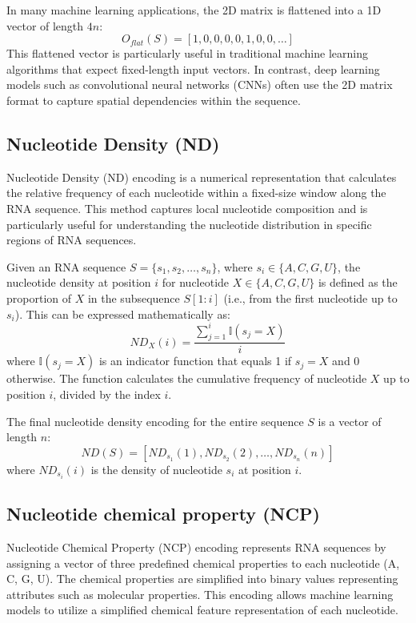     In many machine learning applications, the 2D matrix is flattened into a 1D vector of length $4n$:
    \[
      O_{flat}(S) = [1, 0, 0, 0, 0, 1, 0, 0, \dots]
    \]
    This flattened vector is particularly useful in traditional machine learning algorithms that expect fixed-length input vectors.
    In contrast, deep learning models such as convolutional neural networks (CNNs) often use the 2D matrix format to capture spatial dependencies within the sequence.

  \subsection{Nucleotide Density (ND)}\label{subsec:nd}
    Nucleotide Density (ND) encoding is a numerical representation that calculates the relative frequency of each nucleotide within a fixed-size window along the RNA sequence.
    This method captures local nucleotide composition and is particularly useful for understanding the nucleotide distribution in specific regions of RNA sequences.

    Given an RNA sequence $S = \{s_1, s_2, \dots, s_n\}$, where $s_i \in \{A, C, G, U\}$, the nucleotide density at position $i$ for nucleotide $X \in \{A, C, G, U\}$ is defined as the proportion of $X$ in the subsequence $S[1:i]$ (i.e., from the first nucleotide up to $s_i$). This can be expressed mathematically as:
    \[
      ND_X(i) = \frac{\sum_{j=1}^{i} \mathbb{I}(s_j = X)}{i}
    \]
    where $\mathbb{I}(s_j = X)$ is an indicator function that equals 1 if $s_j = X$ and 0 otherwise.
    The function calculates the cumulative frequency of nucleotide $X$ up to position $i$, divided by the index $i$.

    The final nucleotide density encoding for the entire sequence $S$ is a vector of length $n$:
    \[
      ND(S) = [ND_{s_1}(1), ND_{s_2}(2), \dots, ND_{s_n}(n)]
    \]
    where $ND_{s_i}(i)$ is the density of nucleotide $s_i$ at position $i$.

  \subsection{Nucleotide chemical property (NCP)}\label{subsec:ncp}
    Nucleotide Chemical Property (NCP) encoding represents RNA sequences by assigning a vector of three predefined chemical properties to each nucleotide (A, C, G, U). The chemical properties are simplified into binary values representing attributes such as molecular properties. This encoding allows machine learning models to utilize a simplified chemical feature representation of each nucleotide.

